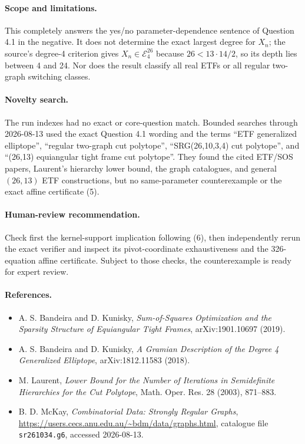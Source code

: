 \documentclass[11pt]{article}
\newcommand{\E}{\mathscr E}
\begin{document}
\paragraph{Scope and limitations.}
This completely answers the yes/no parameter-dependence sentence of Question
4.1 in the negative.  It does not determine the exact largest degree for
$X_n$; the source's degree-4 criterion gives $X_n\in\E_4^{26}$ because
$26<13\cdot14/2$, so its depth lies between 4 and 24.  Nor does the result
classify all real ETFs or all regular two-graph switching classes.

\paragraph{Novelty search.}
The run indexes had no exact or core-question match.  Bounded searches through
2026-08-13 used the exact Question 4.1 wording and the terms
``ETF generalized elliptope'', ``regular two-graph cut polytope'',
``SRG(26,10,3,4) cut polytope'', and ``(26,13) equiangular tight frame cut
polytope''.  They found the cited ETF/SOS papers, Laurent's hierarchy lower
bound, the graph catalogues, and general $(26,13)$ ETF constructions, but no
same-parameter counterexample or the exact affine certificate (5).

\paragraph{Human-review recommendation.}
Check first the kernel-support implication following (6), then independently
rerun the exact verifier and inspect its pivot-coordinate exhaustiveness and
the 326-equation affine certificate.  Subject to those checks, the
counterexample is ready for expert review.

\paragraph{References.}
\begin{itemize}
\item A. S. Bandeira and D. Kunisky, \emph{Sum-of-Squares Optimization and the
Sparsity Structure of Equiangular Tight Frames}, arXiv:1901.10697 (2019).
\item A. S. Bandeira and D. Kunisky, \emph{A Gramian Description of the
Degree 4 Generalized Elliptope}, arXiv:1812.11583 (2018).
\item M. Laurent, \emph{Lower Bound for the Number of Iterations in
Semidefinite Hierarchies for the Cut Polytope}, Math. Oper. Res. 28 (2003),
871--883.
\item B. D. McKay, \emph{Combinatorial Data: Strongly Regular Graphs},
\url{https://users.cecs.anu.edu.au/~bdm/data/graphs.html}, catalogue file
\texttt{sr261034.g6}, accessed 2026-08-13.
\end{itemize}
\end{document}
